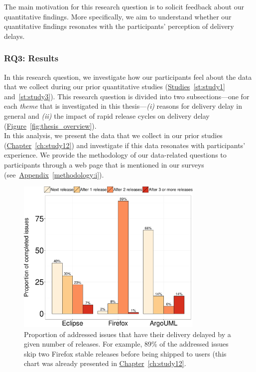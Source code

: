 The main motivation for this research question is to solicit feedback about our
quantitative findings. More specifically, we aim to understand whether our
quantitative findings resonates with the participants' perception of delivery
delays.

\subsubsection*{RQ3: Results}

In this research question, we investigate how our participants feel about the
data that we collect during our prior quantitative studies
(\hyperref[st:study1]{Studies}~\ref{st:study1} and~\ref{st:study3}). This
research question is divided into two subsections---one for each {\em theme}
that is investigated in this thesis---{\em (i)} reasons for delivery delay in
general and {\em (ii)} the impact of rapid release cycles on delivery delay
(\hyperref[fig:thesis_overview]{Figure}~\ref{fig:thesis_overview}).\\

\noindent{}
In this analysis, we present the data that we collect in our prior studies
(\hyperref[ch:study12]{Chapter}~\ref{ch:study12}) and investigate if this data
resonates with participants' experience. We provide the methodology of our
data-related questions to participants through a web page that is mentioned in
our surveys (see~\hyperref[methodology:i]{Appendix}~\ref{methodology:i}).

\begin{figure}
	\centering
	\includegraphics[width=0.80\textwidth,keepaspectratio]
	{chapters/chapter4/figures/CS_rq1-datasets.pdf}
	\caption{Proportion of addressed issues that have their delivery
		delayed by a given number of releases. For example, 89\% of the
	addressed issues skip two Firefox stable releases before being shipped
to users (this chart was already presented in
\hyperref[ch:study12]{Chapter}~\ref{ch:study12}. }
	\label{fig:data-related-rq1}
\end{figure}

